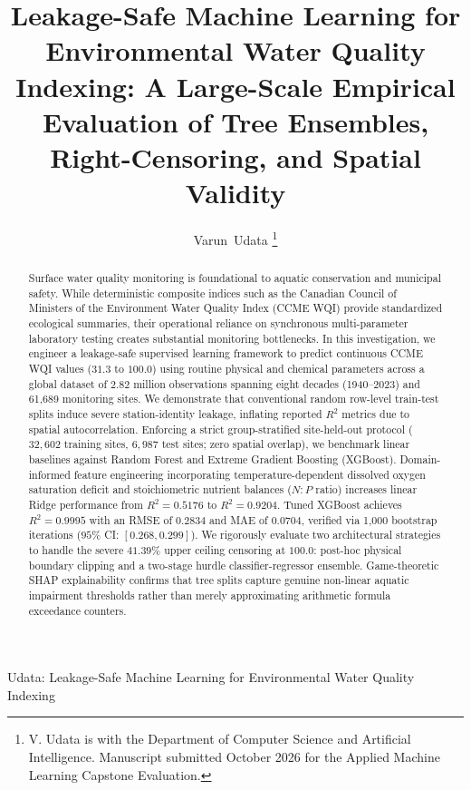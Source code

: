 \documentclass[journal,10pt,twocolumn]{IEEEtran}
\begin{document}
\title{Leakage-Safe Machine Learning for Environmental Water Quality Indexing: A Large-Scale Empirical Evaluation of Tree Ensembles, Right-Censoring, and Spatial Validity}

\author{Varun~Udata
\thanks{V. Udata is with the Department of Computer Science and Artificial Intelligence. Manuscript submitted October 2026 for the Applied Machine Learning Capstone Evaluation.}}

%
{Udata: Leakage-Safe Machine Learning for Environmental Water Quality Indexing}

\maketitle

\begin{abstract}
Surface water quality monitoring is foundational to aquatic conservation and municipal safety. While deterministic composite indices such as the Canadian Council of Ministers of the Environment Water Quality Index (CCME WQI) provide standardized ecological summaries, their operational reliance on synchronous multi-parameter laboratory testing creates substantial monitoring bottlenecks. In this investigation, we engineer a leakage-safe supervised learning framework to predict continuous CCME WQI values ($31.3$ to $100.0$) using routine physical and chemical parameters across a global dataset of $2.82$ million observations spanning eight decades (1940--2023) and 61,689 monitoring sites. We demonstrate that conventional random row-level train-test splits induce severe station-identity leakage, inflating reported $R^2$ metrics due to spatial autocorrelation. Enforcing a strict group-stratified site-held-out protocol ($32,602$ training sites, $6,987$ test sites; zero spatial overlap), we benchmark linear baselines against Random Forest and Extreme Gradient Boosting (XGBoost). Domain-informed feature engineering incorporating temperature-dependent dissolved oxygen saturation deficit and stoichiometric nutrient balances ($N:P$ ratio) increases linear Ridge performance from $R^2 = 0.5176$ to $R^2 = 0.9204$. Tuned XGBoost achieves $R^2 = 0.9995$ with an RMSE of $0.2834$ and MAE of $0.0704$, verified via 1,000 bootstrap iterations ($95\%$ CI: $[0.268, 0.299]$). We rigorously evaluate two architectural strategies to handle the severe $41.39\%$ upper ceiling censoring at $100.0$: post-hoc physical boundary clipping and a two-stage hurdle classifier-regressor ensemble. Game-theoretic SHAP explainability confirms that tree splits capture genuine non-linear aquatic impairment thresholds rather than merely approximating arithmetic formula exceedance counters.
\end{abstract}
\end{document}

